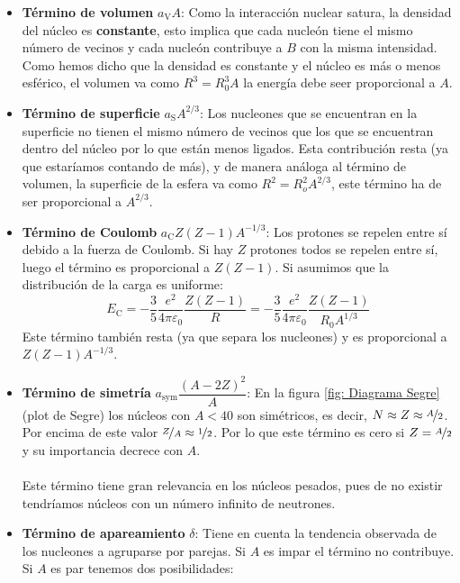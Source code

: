 \begin{itemize}
    \item \textbf{Término de volumen} $a_\mathrm{V}A$: Como la interacción nuclear satura, la densidad del núcleo es \textbf{constante}, esto implica que cada nucleón tiene el mismo número de vecinos y cada nucleón contribuye a $B$ con la misma intensidad. Como hemos dicho que la densidad es constante y el núcleo es más o menos esférico, el volumen va como $R^3=R_0^3A$ la energía debe seer proporcional a $A$.
    \item \textbf{Término de superficie} $a_\mathrm{S}A^{2/3}$: Los nucleones que se encuentran en la superficie no tienen el mismo número de vecinos que los que se encuentran dentro del núcleo por lo que están menos ligados. Esta contribución resta (ya que estaríamos contando de más), y de manera análoga al término de volumen, la superficie de la esfera va como $R^2=R_o^2A^{2/3}$, este término ha de ser proporcional a $A^{2/3}$.
    \item \textbf{Término de Coulomb} $a_\mathrm{C}Z(Z-1)A^{-1/3}$: Los protones se repelen entre sí debido a la fuerza de Coulomb. Si hay $Z$ protones todos se repelen entre sí, luego el término es proporcional a $Z(Z-1)$. Si asumimos que la distribución de la carga es uniforme:
    \begin{equation}
        E_\mathrm{C}=-\frac{3}{5} \frac{e^2}{4\pi\varepsilon_0} \frac{Z(Z-1)}{R}=-\frac{3}{5} \frac{e^2}{4\pi\varepsilon_0} \frac{Z(Z-1)}{R_0A^{1/3}}
    \end{equation}
    Este término también resta (ya que separa los nucleones) y es proporcional a $Z(Z-1)A^{-1/3}$.
    \item \textbf{Término de simetría} $a_\mathrm{sym}\dfrac{(A-2Z)^2}{A}$: En la figura \ref{fig: Diagrama Segre} (plot de Segre) los núcleos con $A<40$ son simétricos, es decir, $N\approx Z \approx \nicefrac{A}{2}$. Por encima de este valor $\nicefrac{Z}{A}\approx \nicefrac{1}{2}$. Por lo que este término es cero si $Z=\nicefrac{A}{2}$ y su importancia decrece con $A$.\\\\
    Este término tiene gran relevancia en los núcleos pesados, pues de no existir tendríamos núcleos con un número infinito de neutrones.
    \item \textbf{Término de apareamiento} $\delta$: Tiene en cuenta la tendencia observada de los nucleones a agruparse por parejas. Si $A$ es impar el término no contribuye. Si $A$ es par tenemos dos posibilidades:
    \begin{itemize}

\end{itemize}
\end{itemize}
